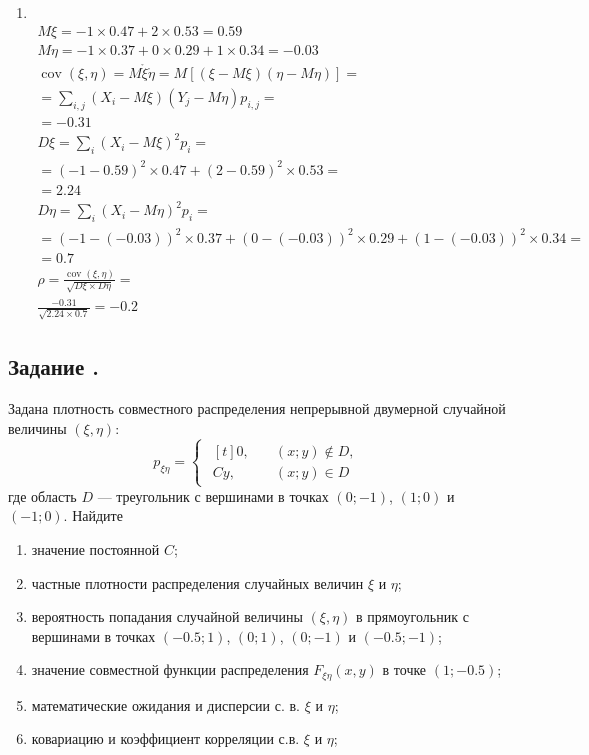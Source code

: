 \documentclass[12pt]{article}
\DeclareMathOperator{\cov}{cov}
\begin{document}
\begin{enumerate}
	\item \mbox{}\\
	      \begin{gather*}
		      M\xi = -1 \times 0.47 + 2 \times 0.53 = 0.59 \\
		      M\eta = -1 \times 0.37 + 0 \times 0.29 + 1 \times 0.34 = -0.03 \\
		      \cov(\xi, \eta) = M\mathring{\xi}\mathring{\eta} = M\left[\left(\xi - M\xi\right)\left(\eta - M\eta\right)\right] = \\
		      = \sum_{i, j}\left(X_i - M\xi\right)\left(Y_j - M\eta\right)p_{i,j} = \\
		      = -0.31 \\ %
		      D\xi = \sum_i\left(X_i-M\xi\right)^2p_i = \\
		      = (-1 - 0.59)^2 \times 0.47 + (2 - 0.59)^2 \times 0.53 = \\
		      = 2.24 \\
		      D\eta = \sum_i\left(X_i-M\eta\right)^2p_i = \\
		      = (-1 - (-0.03))^2 \times 0.37 + (0 - (-0.03))^2 \times 0.29 + (1 - (-0.03))^2 \times 0.34 = \\
		      = 0.7 \\
		      \rho = \frac{\cov(\xi, \eta)}{\sqrt{D\xi \times D\eta}} = \\
		      \frac{-0.31}{\sqrt{2.24 \times 0.7}} = -0.2
	      \end{gather*}
\end{enumerate}

\subsection{Задание .}
Задана плотность совместного распределения непрерывной двумерной случайной величины $(\xi, \eta)$:
\begin{equation*}
	p_{\xi\eta} =
	\begin{cases}
		\begin{aligned}[t]
			0,  & \quad (x;y) \notin D, \\
			Cy, & \quad (x;y) \in D
		\end{aligned}
	\end{cases}
\end{equation*}
где область $D$ --- треугольник с вершинами в точках $(0;-1)$, $(1;0)$ и $(-1;0)$.
Найдите
\begin{enumerate}
	\item значение постоянной $C$;
	\item частные плотности распределения случайных величин $\xi$ и $\eta$;
	\item вероятность попадания случайной величины $(\xi, \eta)$ в прямоугольник с вершинами в точках $(-0.5;1)$, $(0;1)$, $(0;-1)$ и $(-0.5;-1)$;
	\item значение совместной функции распределения $F_{\xi\eta}(x,y)$ в точке $(1;-0.5)$;
	\item математические ожидания и дисперсии с. в. $\xi$ и $\eta$;
	\item ковариацию и коэффициент корреляции с.в. $\xi$ и $\eta$;
\end{enumerate}
\end{document}
